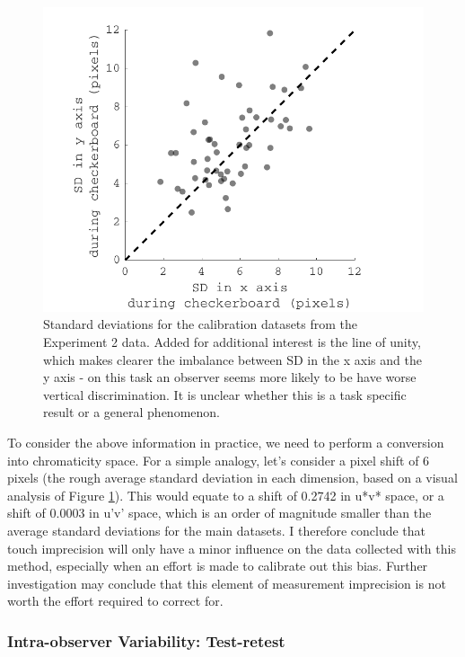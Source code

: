 \begin{figure}[hbtp]
\includegraphics[max width=\textwidth]{figs/tablet/BMtouch.pdf} 
\caption{Standard deviations for the calibration datasets from the Experiment 2 data. Added for additional interest is the line of unity, which makes clearer the imbalance between SD in the x axis and the y axis - on this task an observer seems more likely to be have worse vertical discrimination. It is unclear whether this is a task specific result or a general phenomenon.}
\label{fig:BMtouch}
\end{figure}

To consider the above information in practice, we need to perform a conversion into chromaticity space. For a simple analogy, let's consider a pixel shift of 6 pixels (the rough average standard deviation in each dimension, based on a visual analysis of Figure \ref{fig:BMtouch}). This would equate to a shift of 0.2742 in u*v* space, or a shift of 0.0003 in u'v' space, which is an order of magnitude smaller than the average standard deviations for the main datasets. I therefore conclude that touch imprecision will only have a minor influence on the data collected with this method, especially when an effort is made to calibrate out this bias. Further investigation may conclude that this element of measurement imprecision is not worth the effort required to correct for.

\subsubsection{Intra-observer Variability: Test-retest}

